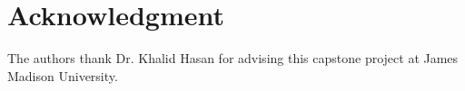 \documentclass[journal]{IEEEtran}
\begin{document}
\section*{Acknowledgment}
The authors thank Dr. Khalid Hasan for advising this capstone project at James Madison University.



\end{document}
